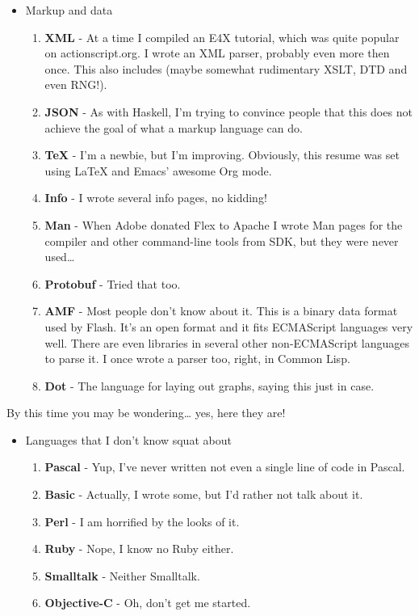 \documentclass[oneside]{memoir}
\begin{document}
\begin{itemize}
\item Markup and data
\begin{enumerate}
\item \textbf{XML} - At a time I compiled an E4X tutorial, which was quite
popular on actionscript.org.  I wrote an XML parser, probably even more
then once.  This also includes (maybe somewhat rudimentary XSLT, DTD and
even RNG!).
\item \textbf{JSON} - As with Haskell, I'm trying to convince people that this does
not achieve the goal of what a markup language can do.
\item \textbf{\TeX{}} - I'm a newbie, but I'm improving.  Obviously, this resume was set
using \LaTeX{} and Emacs' awesome Org mode.
\item \textbf{Info} - I wrote several info pages, no kidding!
\item \textbf{Man} - When Adobe donated Flex to Apache I wrote Man pages for the
compiler and other command-line tools from SDK, but they were never
used\ldots{}
\item \textbf{Protobuf} - Tried that too.
\item \textbf{AMF} - Most people don't know about it.  This is a binary data format
used by Flash.  It's an open format and it fits ECMAScript languages very
well.  There are even libraries in several other non-ECMAScript languages
to parse it.  I once wrote a parser too, right, in Common Lisp.
\item \textbf{Dot} - The language for laying out graphs, saying this just in case.
\end{enumerate}
\end{itemize}

By this time you may be wondering\ldots{} yes, here they are!

\begin{itemize}
\item Languages that I don't know squat about
\begin{enumerate}
\item \textbf{Pascal} - Yup, I've never written not even a single line of code in
Pascal.
\item \textbf{Basic} - Actually, I wrote some, but I'd rather not talk about it.
\item \textbf{Perl} - I am horrified by the looks of it.
\item \textbf{Ruby} - Nope, I know no Ruby either.
\item \textbf{Smalltalk} - Neither Smalltalk.
\item \textbf{Objective-C} - Oh, don't get me started.
\end{enumerate}
\end{itemize}
\end{document}
